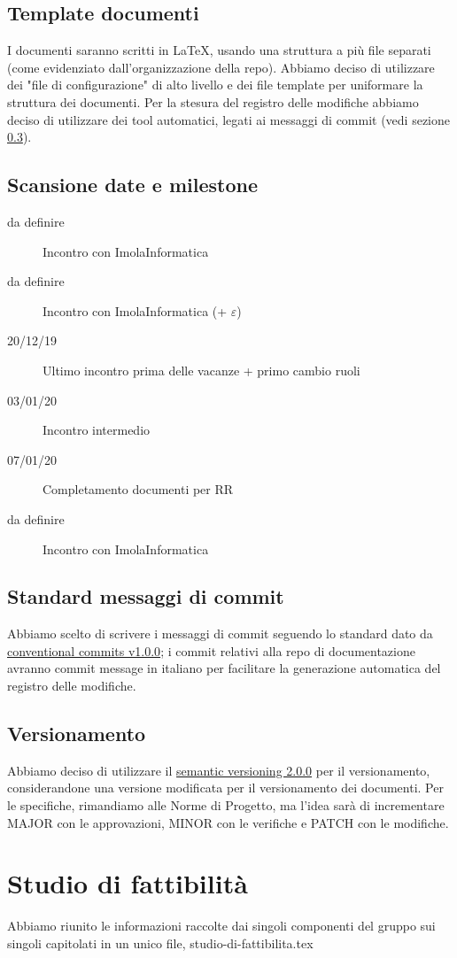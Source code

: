 \documentclass{article}
\begin{document}
	\subsection{Template documenti}
	\label{sub:template_documenti}
	I documenti saranno scritti in LaTeX, usando una struttura a più file separati (come evidenziato dall'organizzazione della repo). Abbiamo deciso di utilizzare dei "file di configurazione" di alto livello e dei file template per uniformare la struttura dei documenti. Per la stesura del registro delle modifiche abbiamo deciso di utilizzare dei tool automatici, legati ai messaggi di commit (vedi sezione \ref{sub:standard_messaggi_di_commit}).
	\subsection{Scansione date e milestone}
	\label{sub:scansione_date_e_milestone}
	\begin{description}
		\item[da definire] Incontro con ImolaInformatica
		\item[da definire] Incontro con ImolaInformatica (+ $\varepsilon$)
		\item[20/12/19] Ultimo incontro prima delle vacanze + primo cambio ruoli
		\item[03/01/20] Incontro intermedio
		\item[07/01/20] Completamento documenti per RR
		\item[da definire] Incontro con ImolaInformatica
	\end{description}
	\subsection{Standard messaggi di commit}
	\label{sub:standard_messaggi_di_commit}
	Abbiamo scelto di scrivere i messaggi di commit seguendo lo standard dato da \href{https://www.conventionalcommits.org/en/v1.0.0/}{conventional commits v1.0.0}; i commit relativi alla repo di documentazione avranno commit message in italiano per facilitare la generazione automatica del registro delle modifiche.
	\subsection{Versionamento}
	\label{sub:versionamento}
	Abbiamo deciso di utilizzare il \href{https://semver.org/}{semantic versioning 2.0.0} per il versionamento, considerandone una versione modificata per il versionamento dei documenti. Per le specifiche, rimandiamo alle Norme di Progetto, ma l'idea sarà di incrementare MAJOR con le approvazioni, MINOR con le verifiche e PATCH con le modifiche.
	\section{Studio di fattibilità}
	\label{sec:studio_di_fattibilità}
	Abbiamo riunito le informazioni raccolte dai singoli componenti del gruppo sui singoli capitolati in un unico file, studio-di-fattibilita.tex
\end{document}
